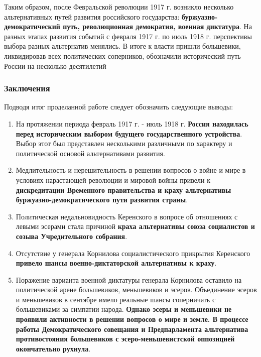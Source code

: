 \documentclass{article}
\begin{document}
\hfill

Таким образом, после Февральской революции 1917 г. возникло несколько альтернативных путей развития российского государства: \textbf{буржуазно-демократический путь, революционная демократия, военная диктатура}. На разных этапах развития событий с февраля 1917 г. по июль 1918 г. перспективы выбора разных альтернатив менялись. В итоге к власти пришли большевики, ликвидировав всех политических соперников, обозначили исторический путь России на несколько десятилетий

\subsubsection{Заключения}

Подводя итог проделанной работе следует обозначить следующие выводы:

\begin{enumerate}
    \item На протяжении периода февраль 1917 г. - июль 1918 г. \textbf{Россия находилась перед историческим выбором будущего государственного устройства}. Выбор этот был представлен несколькими различными по характеру и политической основой альтернативами развития.
    \item Медлительность и нерешительность в решении вопросов о войне и мире в условиях нарастающей революции и мировой войны привели к \textbf{дискредитации Временного правительства и краху альтернативы буржуазно-демократического пути развития страны}.
    \item Политическая недальновидность Керенского в вопросе об отношениях с левыми эсерами стала причиной \textbf{краха альтернативы союза социалистов и созыва Учредительного собрания}.
    \item Отсутствие у генерала Корнилова социалистического прикрытия Керенского \textbf{привело шансы военно-диктаторской альтернативы к краху}.
    \item Поражение варианта военной диктатуры генерала Корнилова оставило на политической арене большевиков, меньшевиков и эсеров. Объединение эсеров и меньшевиков в сентябре имело реальные шансы соперничать с большевиками за симпатии народа. \textbf{Однако эсеры и меньшевики не проявили активности в решении вопросов о мире и земле. В процессе работы Демократического совещания и Предпарламента альтернатива противостояния большевиков с эсеро-меньшевистской оппозицией окончательно рухнула}.
\end{enumerate}

\pagebreak
\end{document}
